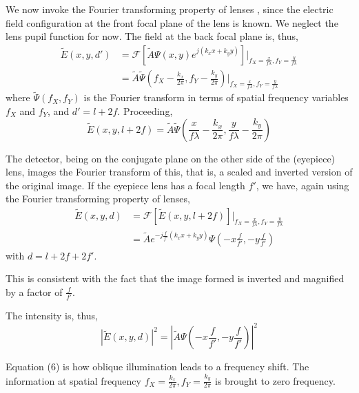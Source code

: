 \documentclass[11pt,a4paper,journal]{IEEEtran}
\begin{document}
We now invoke the Fourier transforming property of lenses \cite[p.~104]{Goodman}, since the electric field configuration at the front focal plane of the lens is known. We neglect the lens pupil function for now. The field at the back focal plane is, thus, 
\begin{equation}
\begin{split}
\tilde{E}(x, y, d') &= \mathcal{F}[\tilde{A} \Psi (x, y) e^{j(k_x x + k_y y)}] \bigg|_{f_X=\frac{x}{f\lambda}, f_Y=\frac{y}{f\lambda}} \\
					  &= \tilde{A} \tilde{\Psi}\left(f_X - \frac{k_x}{2\pi}, f_Y - \frac{k_y}{2\pi}\right) \bigg|_{f_X=\frac{x}{f\lambda}, f_Y=\frac{y}{f\lambda}}
\end{split}
\end{equation}
where $\tilde{\Psi}(f_X, f_Y)$ is the Fourier transform in terms of spatial frequency variables $f_X$ and $f_Y$, and $d'=l+2f$. Proceeding, 
\begin{equation}
\tilde{E}(x, y, l+2f) = \tilde{A} \tilde{\Psi}\left(\frac{x}{f\lambda} - \frac{k_x}{2\pi}, \frac{y}{f\lambda} - \frac{k_y}{2\pi}\right)
\end{equation}

The detector, being on the conjugate plane on the other side of the (eyepiece) lens, images the Fourier transform of this, that is, a scaled and inverted version of the original image. If the eyepiece lens has a focal length $f'$, we have, again using the Fourier transforming property of lenses,
\begin{equation}
\begin{split}
\tilde{E}(x, y, d) &= \mathcal{F}[\tilde{E}(x, y, l+2f)] \bigg|_{f_X=\frac{x}{f\lambda}, f_Y=\frac{y}{f\lambda}} \\
&= \tilde{A} e^{-j\frac{f}{f'}\left(k_x x + k_y y\right)} \Psi\left(-x\frac{f}{f'}, -y\frac{f}{f'}\right)
\end{split}
\end{equation}
with $d=l+2f+2f'$.

This is consistent with the fact that the image formed is inverted and magnified by a factor of $\frac{f}{f'}$.

The intensity is, thus,
\begin{equation}
|\tilde{E}(x, y, d)|^2 = \left|\tilde{A} \Psi\left(-x\frac{f}{f'}, -y\frac{f}{f'}\right)\right|^2
\end{equation}

Equation (6) is how oblique illumination leads to a frequency shift. The information at spatial frequency $f_X = \frac{k_x}{2\pi}, f_Y = \frac{k_y}{2\pi}$ is brought to zero frequency.
\end{document}
